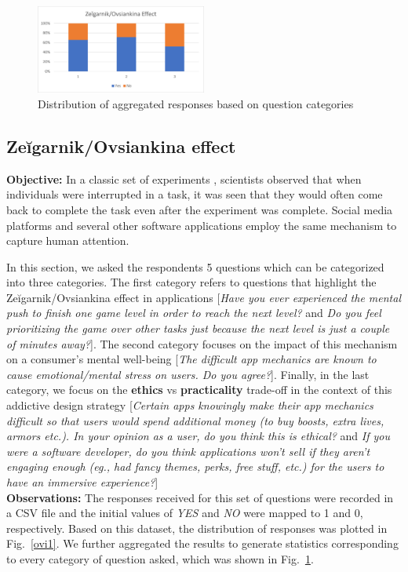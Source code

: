 \documentclass[conference]{IEEEtran}
\begin{document}
\begin{figure}[htbp]
\centerline{\includegraphics[width=0.5\textwidth]{ovi2.png}}
\caption{Distribution of aggregated responses based on question categories}
\label{ovi2}
\end{figure}

\subsection{Zeĭgarnik/Ovsiankina effect}
\textbf{Objective:} In a classic set of experiments \cite{zie1927, kina1928}, scientists observed that when individuals were interrupted in a task, it was seen that they would often come back to complete the task even after the experiment was complete. Social media platforms and several other software applications employ the same mechanism to capture human attention.

In this section, we asked the respondents 5 questions which can be categorized into three categories. The first category refers to questions that highlight the Zeĭgarnik/Ovsiankina effect in applications [\textit{Have you ever experienced the mental push to finish one game level in order to reach the next level?} and \textit{Do you feel prioritizing the game over other tasks just because the next level is just a couple of minutes away?}]. The second category focuses on the impact of this mechanism on a consumer's mental well-being [\textit{The difficult app mechanics are known to cause emotional/mental stress on users. Do you agree?}]. Finally, in the last category, we focus on the \textbf{ethics} vs \textbf{practicality} trade-off in the context of this addictive design strategy [\textit{Certain apps knowingly make their app mechanics difficult so that users would spend additional money (to buy boosts, extra lives, armors etc.). In your opinion as a user, do you think this is ethical?} and \textit{If you were a software developer, do you think applications won't sell if they aren't engaging enough (eg., had fancy themes, perks, free stuff, etc.) for the users to have an immersive experience?}]\\

\textbf{Observations:} The responses received for this set of questions were recorded in a CSV file and the initial values of \textit{YES} and \textit{NO} were mapped to 1 and 0, respectively. Based on this dataset, the distribution of responses was plotted in Fig.~\ref{ovi1}. We further aggregated the results to generate statistics corresponding to every category of question asked, which was shown in Fig.~\ref{ovi2}.
\end{document}
